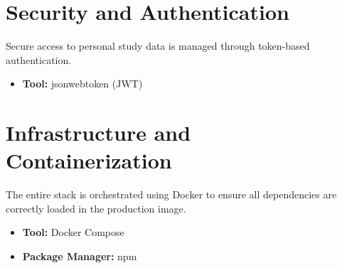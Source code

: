 \documentclass{article}
\begin{document}
\section{Security and Authentication}
Secure access to personal study data is managed through token-based authentication.
\begin{itemize}
    \item \textbf{Tool:} jsonwebtoken (JWT)
\end{itemize}

\section{Infrastructure and Containerization}
The entire stack is orchestrated using Docker to ensure all dependencies are correctly loaded in the production image.
\begin{itemize}
    \item \textbf{Tool:} Docker Compose
    \item \textbf{Package Manager:} npm
\end{itemize}
\end{document}
